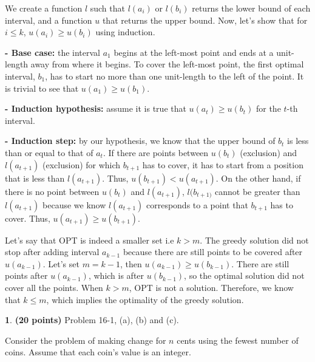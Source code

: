 \documentclass[11pt]{article}
\theoremstyle{definition}
\theoremstyle{theorem}
\newtheorem{prob}{}
\begin{document}
We create a function $l$ such that $l(a_i)$ or $l(b_i)$ returns the lower bound of each interval, and a function $u$ that returns the upper bound. Now, let's show that for $i \le k$, $u(a_i) \ge u(b_i)$ using induction.

\textbf{- Base case:} the interval $a_1$ begins at the left-most point and ends at a unit-length away from where it begins. To cover the left-most point, the first optimal interval, $b_1$, has to start no more than one unit-length to the left of the point. It is trivial to see that $u(a_1) \ge u(b_1)$.

\textbf{- Induction hypothesis:} assume it is true that $u(a_t) \ge u(b_t)$ for the $t$-th interval.

\textbf{- Induction step:} by our hypothesis, we know that the upper bound of $b_t$ is less than or equal to that of $a_t$. If there are points between $u(b_t)$ (exclusion) and $l(a_{t+1})$ (exclusion) for which $b_{t+1}$ has to cover, it has to start from a position that is less than $l(a_{t+1})$. Thus, $u(b_{t+1}) < u(a_{t+1})$. On the other hand, if there is no point between $u(b_t)$ and $l(a_{t+1})$, $l(b_{t+1)}$ cannot be greater than $l(a_{t+1})$ because we know $l(a_{t+1})$ corresponds to a point that $b_{t+1}$ has to cover. Thus, $u(a_{t+1}) \ge u(b_{t+1})$.

Let's say that OPT is indeed a smaller set i.e $k > m$. The greedy solution did not stop after adding interval $a_{k-1}$ because there are still points to be covered after $u(a_{k-1})$. Let's set $m = k - 1$, then $u(a_{k-1}) \ge u(b_{k-1})$. There are still points after $u(a_{k-1})$, which is after $u(b_{k-1})$, so the optimal solution did not cover all the points. When $k > m$, OPT is not a solution. Therefore, we know that $k \le m$, which implies the optimality of the greedy solution.


\newpage
\begin{prob} \textbf{(20 points)} Problem 16-1, (a), (b) and (c).
\end{prob}
Consider the problem of making change for $n$ cents using the fewest number of coins. Assume that each coin’s value is an integer.
\end{document}
